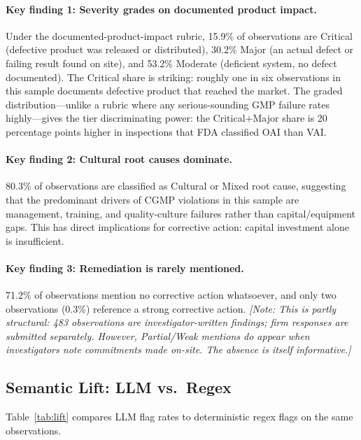 \documentclass[12pt]{article}
\newcommand{\note}[1]{{\color{blue}\textit{[Note: #1]}}}
\begin{document}
\paragraph{Key finding 1: Severity grades on documented product impact.}
Under the documented-product-impact rubric, 15.9\% of observations are
Critical (defective product was released or distributed), 30.2\% Major
(an actual defect or failing result found on site), and 53.2\% Moderate
(deficient system, no defect documented).
The Critical share is striking: roughly one in six observations in this
sample documents defective product that reached the market.
The graded distribution---unlike a rubric where any serious-sounding GMP
failure rates highly---gives the tier discriminating power:
the Critical$+$Major share is 20 percentage points higher in inspections
that FDA classified OAI than VAI.

\paragraph{Key finding 2: Cultural root causes dominate.}
80.3\% of observations are classified as Cultural or Mixed root cause,
suggesting that the predominant drivers of CGMP violations in this sample
are management, training, and quality-culture failures rather than
capital/equipment gaps.
This has direct implications for corrective action: capital investment alone
is insufficient.

\paragraph{Key finding 3: Remediation is rarely mentioned.}
71.2\% of observations mention no corrective action whatsoever, and only
two observations (0.3\%) reference a strong corrective action.
\note{This is partly structural: 483 observations are investigator-written
findings; firm responses are submitted separately.
However, Partial/Weak mentions do appear when investigators note commitments
made on-site. The absence is itself informative.}

\subsection{Semantic Lift: LLM vs.\ Regex}

Table~\ref{tab:lift} compares LLM flag rates to deterministic regex flags
on the same observations.
\end{document}

